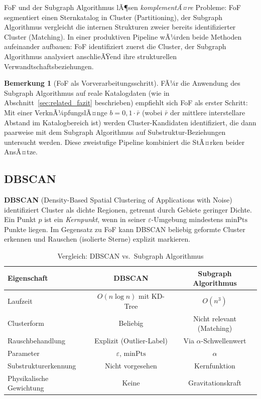 ﻿\documentclass[a4paper,12pt]{report}
\theoremstyle{definition}
\newtheorem{bemerkung}{Bemerkung}
\begin{document}
FoF und der Subgraph Algorithmus lÃ¶sen \emph{komplementÃ¤re} Probleme: FoF segmentiert einen Sternkatalog in Cluster (Partitioning), der Subgraph Algorithmus vergleicht die internen Strukturen zweier bereits identifizierter Cluster (Matching). In einer produktiven Pipeline wÃ¼rden beide Methoden aufeinander aufbauen: FoF identifiziert zuerst die Cluster, der Subgraph Algorithmus analysiert anschlieÃŸend ihre strukturellen Verwandtschaftsbeziehungen.

\begin{bemerkung}[FoF als Vorverarbeitungsschritt]
FÃ¼r die Anwendung des Subgraph Algorithmus auf reale Katalogdaten (wie in Abschnitt~\ref{sec:related_fazit} beschrieben) empfiehlt sich FoF als erster Schritt: Mit einer VerknÃ¼pfungslÃ¤nge $b = 0{,}1 \cdot \bar{r}$ (wobei $\bar{r}$ der mittlere interstellare Abstand im Katalogbereich ist) werden Cluster-Kandidaten identifiziert, die dann paarweise mit dem Subgraph Algorithmus auf Substruktur-Beziehungen untersucht werden. Diese zweistufige Pipeline kombiniert die StÃ¤rken beider AnsÃ¤tze.
\end{bemerkung}

\subsection{DBSCAN}
\label{ssec:dbscan}

\textbf{DBSCAN} (Density-Based Spatial Clustering of Applications with Noise) \cite{ester1996} identifiziert Cluster als dichte Regionen, getrennt durch Gebiete geringer Dichte. Ein Punkt $p$ ist ein \emph{Kernpunkt}, wenn in seiner $\varepsilon$-Umgebung mindestens $\mathrm{minPts}$ Punkte liegen. Im Gegensatz zu FoF kann DBSCAN beliebig geformte Cluster erkennen und Rauschen (isolierte Sterne) explizit markieren.

\begin{table}[H]
\centering
\caption{Vergleich: DBSCAN vs.\ Subgraph Algorithmus}
\label{tab:dbscan}
\begin{tabular}{lcc}
\toprule
Eigenschaft & DBSCAN & Subgraph Algorithmus \\
\midrule
Laufzeit & $O(n \log n)$ mit KD-Tree & $O(n^3)$ \\
Clusterform & Beliebig & Nicht relevant (Matching) \\
Rauschbehandlung & Explizit (Outlier-Label) & Via $\alpha$-Schwellenwert \\
Parameter & $\varepsilon$, $\mathrm{minPts}$ & $\alpha$ \\
Substrukturerkennung & Nicht vorgesehen & Kernfunktion \\
Physikalische Gewichtung & Keine & Gravitationskraft \\
\bottomrule
\end{tabular}
\end{table}
\end{document}
